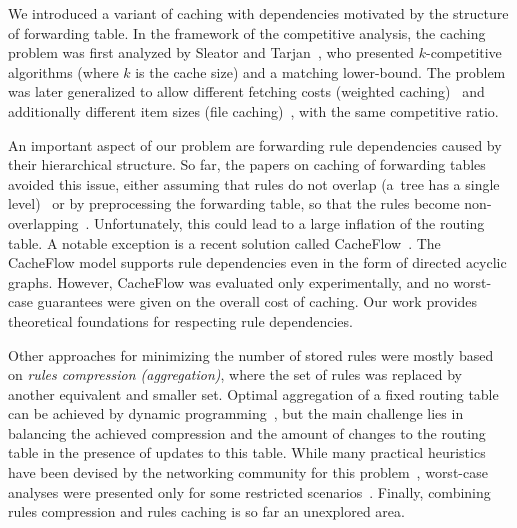 We introduced a variant of caching with dependencies motivated by the structure of forwarding table.
In the framework of the competitive analysis, the caching problem was
first analyzed  by Sleator and Tarjan~\cite{SleTar85}, who presented $k$-competitive algorithms (where $k$ is the cache size) and a matching lower-bound.
The problem was later generalized to allow different fetching
costs (weighted caching)~\cite{double-coverage,young-paging-greedy-dual} and
additionally different item sizes (file caching)~\cite{young-paging-landlord},
with the same competitive ratio.


An important aspect of our problem are forwarding rule dependencies caused by their hierarchical structure.
So far, the papers on caching of forwarding tables avoided this issue, either assuming
that rules do not overlap (a~tree has a single level)~\cite{route-caching-flat} 
or by preprocessing the forwarding table, so that the rules become
non-overlapping~\cite{prefix-caching,fib-caching-non-overlapping}.
Unfortunately, this could lead to a large inflation of the routing table. A
notable exception is a recent solution called CacheFlow~\cite{cacheflow}. The
CacheFlow model supports rule  dependencies even in the form of directed acyclic
graphs. However, CacheFlow was evaluated only experimentally, and no
worst-case guarantees were given on the overall cost of caching. Our work
provides theoretical foundations for respecting rule dependencies.


Other approaches for minimizing the number of stored rules were mostly based
on \emph{rules compression (aggregation)}, where the set of rules was replaced
by another equivalent and smaller set. Optimal aggregation of a fixed routing
table can be achieved by dynamic
programming~\cite{ortc,fib-compression-two-dimensional}, but the main
challenge lies in balancing the achieved compression and the amount of changes
to the routing table in the presence of updates to this table. While
many practical heuristics have been devised by the networking community for
this problem~\cite{mms,fib-compression-fifa,fib-compression-globecom10,fib-compression-infocom13,fib-sigcomm,fib-compression-smalta,fib-compression-infocom10},
worst-case analyses were presented only for some restricted
scenarios~\cite{fib-icdcs,fib-sirocco}. Finally, combining rules compression and rules
caching is so far an unexplored area.




